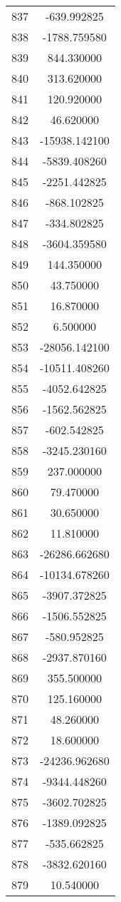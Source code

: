 \documentclass[12pt]{article}
\begin{document}
\begin{longtable}{@{}cc@{}}
837 & -639.992825 \\
838 & -1788.759580 \\
839 & 844.330000 \\
840 & 313.620000 \\
841 & 120.920000 \\
842 & 46.620000 \\
843 & -15938.142100 \\
844 & -5839.408260 \\
845 & -2251.442825 \\
846 & -868.102825 \\
847 & -334.802825 \\
848 & -3604.359580 \\
849 & 144.350000 \\
850 & 43.750000 \\
851 & 16.870000 \\
852 & 6.500000 \\
853 & -28056.142100 \\
854 & -10511.408260 \\
855 & -4052.642825 \\
856 & -1562.562825 \\
857 & -602.542825 \\
858 & -3245.230160 \\
859 & 237.000000 \\
860 & 79.470000 \\
861 & 30.650000 \\
862 & 11.810000 \\
863 & -26286.662680 \\
864 & -10134.678260 \\
865 & -3907.372825 \\
866 & -1506.552825 \\
867 & -580.952825 \\
868 & -2937.870160 \\
869 & 355.500000 \\
870 & 125.160000 \\
871 & 48.260000 \\
872 & 18.600000 \\
873 & -24236.962680 \\
874 & -9344.448260 \\
875 & -3602.702825 \\
876 & -1389.092825 \\
877 & -535.662825 \\
878 & -3832.620160 \\
879 & 10.540000 \\

\end{longtable}
\end{document}
